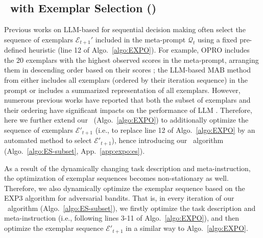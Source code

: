 \subsection{\alg~with Exemplar Selection (\alges)}
\label{subsec:expo:es}
Previous works on LLM-based for sequential decision making often select the sequence of exemplars $\mathcal{E}_{t+1}'$ included in the meta-prompt $\mathcal{Q}_t$ using a fixed pre-defined heuristic
(line 12 of Algo.~\ref{algo:EXPO}).
For example, OPRO includes the 20 exemplars with the highest observed scores in the meta-prompt, arranging them in descending order based on their scores \cite{yang2023large}; 
the LLM-based MAB method from \citet{krishnamurthy2024can} either includes all exemplars (ordered by their iteration sequence) in the prompt or includes a summarized representation of all exemplars.
However, numerous previous works have reported that both the subset of exemplars and their ordering have significant impacts on the performance of LLM \cite{wu2024prompt}.
Therefore, here we further extend our \alg~(Algo.~\ref{algo:EXPO}) to additionally optimize the sequence of exemplars $\mathcal{E}'_{t+1}$ (i.e., to replace line 12 of Algo.~\ref{algo:EXPO} by an automated method to select $\mathcal{E}'_{t+1}$), 
hence introducing our \alges~algorithm (Algo.~\ref{algo:ES-subset}, App.~\ref{app:expo:es}).

As a result of the dynamically changing task description and meta-instruction, the optimization of exemplar sequences becomes non-stationary as well. Therefore, we also dynamically optimize the exemplar sequence based on the EXP3 algorithm for adversarial bandits.
That is, in every iteration of our \alges~algorithm (Algo.~\ref{algo:ES-subset}), we firstly optimize the task description and meta-instruction (i.e., following lines 3-11 of Algo.~\ref{algo:EXPO}), and then optimize the exemplar sequence $\mathcal{E}'_{t+1}$ in a similar way to Algo.~\ref{algo:EXPO}.

